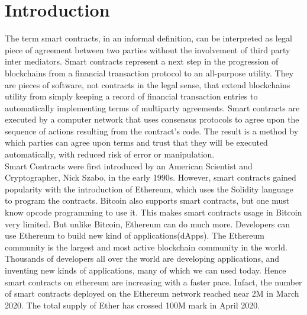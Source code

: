 \chapter{Introduction}
\label{ch:int}

The term smart contracts, in an informal definition, can be interpreted as legal piece of agreement between two parties without the involvement of third party inter mediators. Smart contracts represent a next step in the progression of blockchains from a financial transaction protocol to an all-purpose utility. They are pieces of software, not contracts in the legal sense, that extend blockchains utility from simply keeping a record of financial transaction entries to automatically implementing terms of multiparty agreements. Smart contracts are executed by a computer network that uses consensus protocols to agree upon the sequence of actions resulting from the contract’s code. The result is a method by which parties can agree upon terms and trust that they will be executed automatically, with reduced risk of error or manipulation.\cite{deloitte} \\
Smart Contracts were first introduced by an American Scientist and Cryptographer, Nick Szabo, in the early 1990s\cite{smartcontract}. However, smart contracts gained popularity with the introduction of Ethereum, which uses the Solidity language to program the contracts. Bitcoin also supports smart contracts, but one must know opcode programming to use it. This makes smart contracts usage in Bitcoin very limited\cite{forbes}. But unlike Bitcoin, Ethereum can do much more. Developers can use Ethereum to build new kind of applications(dApps). The Ethereum community is the largest and most active blockchain community in the world. Thousands of developers all over the world are developing applications, and inventing new kinds of applications, many of which we can used today. Hence smart contracts on ethereum are increasing with a faster pace. Infact, the number of smart contracts deployed on the Ethereum network reached near 2M in March 2020\cite{cointelegrah}. The total supply of Ether has crossed 100M mark in April 2020\cite{ether}.\\
